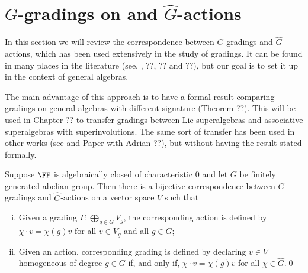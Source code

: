 
\section{$G$-gradings on  and $\widehat G$-actions}

In this section we will review the correspondence between $G$-gradings and $\widehat G$-actions, which has been used extensively in the study of gradings.
It can be found in many places in the literature (see, \eg, ??, ?? and ??), but our goal is to set it up in the context of general algebras.

The main advantage of this approach is to have a formal result comparing gradings on general algebras with different signature (Theorem ??).
This will be used in Chapter ?? to transfer gradings between Lie superalgebras and associative superalgebras with superinvolutions.
The same sort of transfer has been used in other works (see \cite{livromicha} and Paper with Adrian ??), but without having the result stated formally.


\begin{thm}\label{thm:g-hat-correspondence}
	Suppose $\FF$ is algebraically closed of characteristic $0$ and let $G$ be finitely generated abelian group.
	Then there is a bijective correspondence between $G$-gradings and $\widehat G$-actions on a vector space $V$ such that
	\begin{enumerate}[(i)]
		\item Given a grading $\Gamma: \bigoplus_{g\in G} V_g$, the corresponding action is defined by $\chi\cdot v = \chi(g) v$ for all $v\in V_g$ and all $g\in G$;
		\item Given an action, corresponding grading is defined by declaring $v\in V$ homogeneous of degree $g\in G$ if, and only if, $\chi\cdot v = \chi(g) v$ for all $\chi \in \widehat G$.\qed
	\end{enumerate}
\end{thm}

